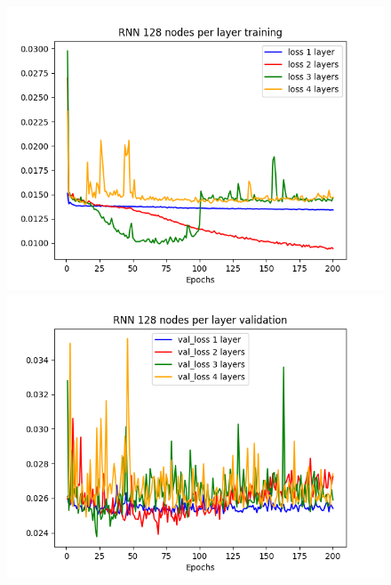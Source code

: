 \documentclass[11pt]
{article}
\begin{document}
\begin{figure}[ht]
\begin{minipage}[b]{0.33\linewidth}
		\includegraphics[width=\linewidth]{../TESTS_RESULTS/RNN_tests/plots/128_training.png} 
	\end{minipage}%
	\begin{minipage}[b]{0.33\linewidth}
		\centering
		\includegraphics[width=\linewidth]{../TESTS_RESULTS/RNN_tests/plots/128_validation.png} 
	\end{minipage} 
\hspace*{-2cm}  
	\begin{minipage}[b]{0.33\linewidth}
		\centering

\end{minipage}
\end{figure}
\end{document}
